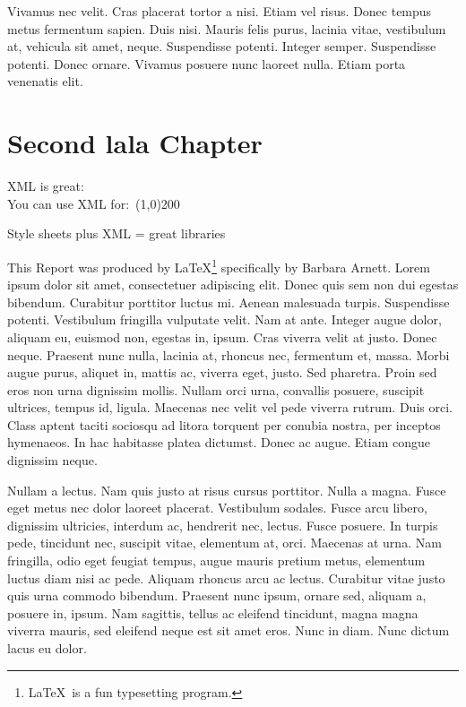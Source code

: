 Vivamus nec velit. Cras placerat tortor a nisi. Etiam vel risus. Donec tempus metus fermentum sapien. Duis nisi. Mauris felis purus, lacinia vitae, vestibulum at, vehicula sit amet, neque. Suspendisse potenti. Integer semper. Suspendisse potenti. Donec ornare. Vivamus posuere nunc laoreet nulla. Etiam porta venenatis elit.


\chapter{Second lala Chapter}
XML is great:\\
You can use XML for:\
\line(1,0){200}
\vspace{8 mm}\

Style sheets plus XML = great libraries

This Report was produced by LaTeX\footnote {\LaTeX\ is a fun typesetting program.} specifically by Barbara Arnett.
Lorem ipsum dolor sit amet, consectetuer adipiscing elit. Donec quis sem non dui egestas bibendum. Curabitur porttitor luctus mi. Aenean malesuada turpis. Suspendisse potenti. Vestibulum fringilla vulputate velit. Nam at ante. Integer augue dolor, aliquam eu, euismod non, egestas in, ipsum. Cras viverra velit at justo. Donec neque. Praesent nunc nulla, lacinia at, rhoncus nec, fermentum et, massa. Morbi augue purus, aliquet in, mattis ac, viverra eget, justo. Sed pharetra. Proin sed eros non urna dignissim mollis. Nullam orci urna, convallis posuere, suscipit ultrices, tempus id, ligula. Maecenas nec velit vel pede viverra rutrum. Duis orci. Class aptent taciti sociosqu ad litora torquent per conubia nostra, per inceptos hymenaeos. In hac habitasse platea dictumst. Donec ac augue. Etiam congue dignissim neque.

%

Nullam a lectus. Nam quis justo at risus cursus porttitor. Nulla a magna. Fusce eget metus nec dolor laoreet placerat. Vestibulum sodales. Fusce arcu libero, dignissim ultricies, interdum ac, hendrerit nec, lectus. Fusce posuere. In turpis pede, tincidunt nec, suscipit vitae, elementum at, orci. Maecenas at urna. Nam fringilla, odio eget feugiat tempus, augue mauris pretium metus, elementum luctus diam nisi ac pede. Aliquam rhoncus arcu ac lectus. Curabitur vitae justo quis urna commodo bibendum. Praesent nunc ipsum, ornare sed, aliquam a, posuere in, ipsum. Nam sagittis, tellus ac eleifend tincidunt, magna magna viverra mauris, sed eleifend neque est sit amet eros. Nunc in diam. Nunc dictum lacus eu dolor.

